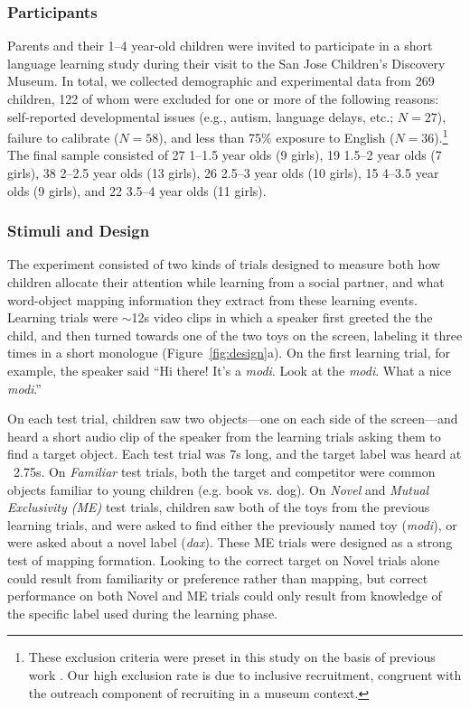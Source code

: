 \documentclass[man,floatsintext]{apa6}
\begin{document}
\subsubsection{Participants}

Parents and their 1--4 year-old children were invited to participate in a short language learning study during their visit to the San Jose Children's Discovery Museum. In total, we collected demographic and experimental data from 269 children, 122 of whom were excluded for one or more of the following reasons: self-reported developmental issues (e.g., autism, language delays, etc.; $N= 27$), failure to calibrate ($N=58$), and less than 75\% exposure to English ($N=36$).\footnote{These exclusion criteria were preset in this study on the basis of previous work \cite{Yurovsky2013c}. Our high exclusion rate is due to inclusive recruitment, congruent with the outreach component of recruiting in a museum context.} The final sample consisted of 27 1--1.5 year olds (9 girls), 19 1.5--2 year olds (7 girls), 38 2--2.5 year olds (13 girls), 26 2.5--3 year olds (10 girls), 15 4--3.5 year olds (9 girls), and 22 3.5--4 year olds (11 girls).

\subsubsection{Stimuli and Design}

The experiment consisted of two kinds of trials designed to measure both how children allocate their attention while learning from a social partner, and what word-object mapping information they extract from these learning events. Learning trials were $\sim$12s video clips in which a speaker first greeted the the child, and then turned towards one of the two toys on the screen, labeling it three times in a short monologue (Figure~\ref{fig:design}a). On the first learning trial, for example, the speaker said ``Hi there! It's a \emph{modi}. Look at the \emph{modi}. What a nice \emph{modi}.''

On each test trial, children saw two objects---one on each side of the screen---and heard a short audio clip of the speaker from the learning trials asking them to find a target object. Each test trial was 7s long, and the target label was heard at ~2.75s. On \emph{Familiar} test trials, both the target and competitor were common objects familiar to young children (e.g. book vs. dog). On \emph{Novel} and  \emph{Mutual Exclusivity (ME)} test trials, children saw both of the toys from the previous learning trials, and were asked to find either the previously named toy (\emph{modi}), or were asked about a novel label (\emph{dax}). These ME trials were designed as a strong test of mapping formation. Looking to the correct target on Novel trials alone could result from familiarity or preference rather than mapping, but correct performance on both Novel and ME trials could only result from knowledge of the specific label used during the learning phase.
\end{document}
